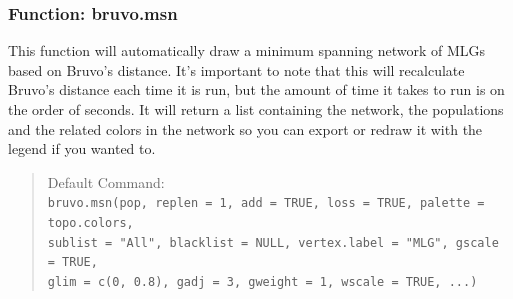 \documentclass[letterpaper]{article}
\newcommand{\tab}{\hspace*{1em}}
\begin{document}
\subsubsection{Function: bruvo.msn}\label{index:trees:bruvo.msn}
\tab\tab This function will automatically draw a minimum spanning network of MLGs based on Bruvo's distance. It's important to note that this will recalculate Bruvo's distance each time it is run, but the amount of time it takes to run is on the order of seconds. It will return a list containing the network, the populations and the related colors in the network so you can export or redraw it with the legend if you wanted to.
\begin{quote}
Default Command:\\
\texttt{bruvo.msn(pop, replen = 1, add = TRUE, loss = TRUE, palette = topo.colors,\\ 
  \tab sublist = "All", blacklist = NULL, vertex.label = "MLG", gscale = TRUE, \\
  \tab glim = c(0, 0.8), gadj = 3, gweight = 1, wscale = TRUE, ...)
}
\end{quote}
\end{document}
